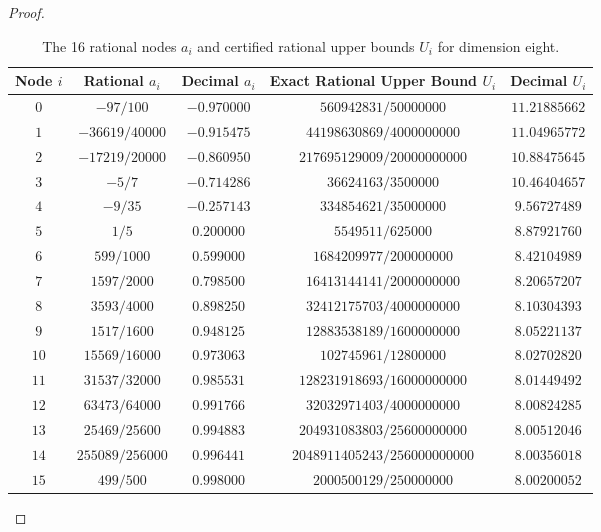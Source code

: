 \documentclass[11pt,reqno]{article}
\theoremstyle{definition}
\begin{document}
\begin{proof}
\begin{table}[htbp]
\centering
\small
\caption{The 16 rational nodes $a_i$ and certified rational upper bounds $U_i$ for dimension eight.}\label{tab:n8-nodes}
\begin{tabular}{ccccc}
\hline
Node $i$ & Rational $a_i$ & Decimal $a_i$ & Exact Rational Upper Bound $U_i$ & Decimal $U_i$ \\
\hline
$0$ & $-97/100$ & $-0.970000$ & $560942831/50000000$ & $11.21885662$ \\
$1$ & $-36619/40000$ & $-0.915475$ & $44198630869/4000000000$ & $11.04965772$ \\
$2$ & $-17219/20000$ & $-0.860950$ & $217695129009/20000000000$ & $10.88475645$ \\
$3$ & $-5/7$ & $-0.714286$ & $36624163/3500000$ & $10.46404657$ \\
$4$ & $-9/35$ & $-0.257143$ & $334854621/35000000$ & $9.56727489$ \\
$5$ & $1/5$ & $0.200000$ & $5549511/625000$ & $8.87921760$ \\
$6$ & $599/1000$ & $0.599000$ & $1684209977/200000000$ & $8.42104989$ \\
$7$ & $1597/2000$ & $0.798500$ & $16413144141/2000000000$ & $8.20657207$ \\
$8$ & $3593/4000$ & $0.898250$ & $32412175703/4000000000$ & $8.10304393$ \\
$9$ & $1517/1600$ & $0.948125$ & $12883538189/1600000000$ & $8.05221137$ \\
$10$ & $15569/16000$ & $0.973063$ & $102745961/12800000$ & $8.02702820$ \\
$11$ & $31537/32000$ & $0.985531$ & $128231918693/16000000000$ & $8.01449492$ \\
$12$ & $63473/64000$ & $0.991766$ & $32032971403/4000000000$ & $8.00824285$ \\
$13$ & $25469/25600$ & $0.994883$ & $204931083803/25600000000$ & $8.00512046$ \\
$14$ & $255089/256000$ & $0.996441$ & $2048911405243/256000000000$ & $8.00356018$ \\
$15$ & $499/500$ & $0.998000$ & $2000500129/250000000$ & $8.00200052$ \\
\hline
\end{tabular}
\end{table}


\end{proof}
\end{document}
